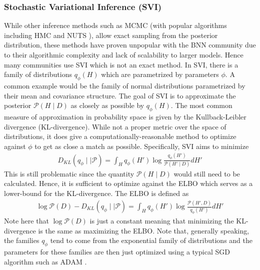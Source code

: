 \subsubsection{Stochastic Variational Inference (SVI)}
While other inference methods such as MCMC (with popular algorithms including HMC and NUTS \cite{betancourt_conceptual_2018} \cite{hoffman_no-u-turn_2011}), allow exact sampling from the posterior distribution, these methods have proven unpopular with the BNN community due to their algorithmic complexity and lack of scalability to larger models. Hence many communities use SVI which is not an exact method. In SVI, there is a family of distributions $q_{\phi}(H)$ which are parametrized by parameters $\phi$. A common example would be the family of normal distributions parametrized by their mean and covariance structure. The goal of SVI is to approximate the posterior $\mathcal{P}(H \mid D)$ as closely as possible by $q_{\phi}(H)$. The most common measure of approximation in probability space is given by the Kullback-Leibler divergence (KL-divergence). While not a proper metric over the space of distributions, it does give a computationally-reasonable method to optimize against $\phi$ to get as close a match as possible. Specifically, SVI aims to minimize
\begin{align*}
  D_{KL}(q_{\phi} \mid\mid \mathcal{P}) = \int_H q_{\phi}(H')\log \frac{q_{\phi}(H')}{\mathcal{P}(H' \mid D)} dH'
\end{align*} 
This is still problematic since the quantity $\mathcal{P}(H \mid D)$ would still need to be calculated. Hence, it is sufficient to optimize against the ELBO which serves as a lower-bound for the KL-divergence. The ELBO is defined as
\begin{align*}
  \log \mathcal{P}(D) - D_{KL}(q_{\phi} \mid\mid \mathcal{P}) = \int_H q_{\phi}(H')\log \frac{\mathcal{P}(H', D)}{q_{\phi}(H')} dH'
\end{align*}
Note here that $\log \mathcal{P}(D)$ is just a constant meaning that minimizing the KL-divergence is the same as maximizing the ELBO. Note that, generally speaking, the families $q_{\phi}$ tend to come from the exponential family of distributions and the parameters for these families are then just optimized using a typical SGD algorithm such as ADAM \cite{kingma_adam_2017}.

